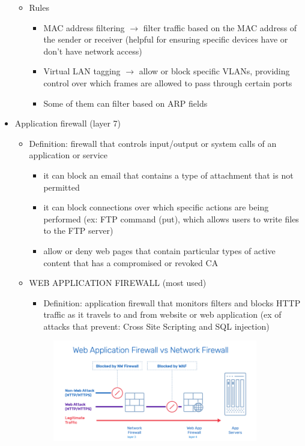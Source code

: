 \documentclass{article}
\begin{document}
\begin{itemize}
\begin{itemize}
\begin{figure}[h]
      \end{figure}
      \item Rules
        \begin{itemize}
          \item MAC address filtering $\rightarrow$ filter traffic based on the MAC address of the sender or receiver (helpful for ensuring specific devices have or don’t have network access)
          \item Virtual LAN tagging $\rightarrow$ allow or block specific VLANs, providing control over which frames are allowed to pass through certain ports
          \item Some of them can filter based on ARP fields
        \end{itemize}
    \end{itemize}
  \item Application firewall (layer 7) 
    \begin{itemize}
      \item Definition: firewall that controls input/output or system calls of an application or service 
        \begin{itemize}
          \item it can block an email that contains a type of attachment that is not permitted
          \item it can block connections over which specific actions are being performed (ex: FTP command (put), which allows users to write files to the FTP server)
          \item allow or deny web pages that contain particular types of active content that has a compromised or revoked CA
        \end{itemize}
      \item WEB APPLICATION FIREWALL (most used)
        \begin{itemize}
          \item Definition: application firewall that monitors filters and blocks HTTP traffic as it travels to and from website or web application (ex of attacks that prevent: Cross Site Scripting and SQL injection)
        \end{itemize}
        \begin{figure}[h]
            \centering
            \includegraphics[width=0.90\textwidth]{figure/web_appl_firewall.png}

\end{figure}
\end{itemize}
\end{itemize}
\end{document}
